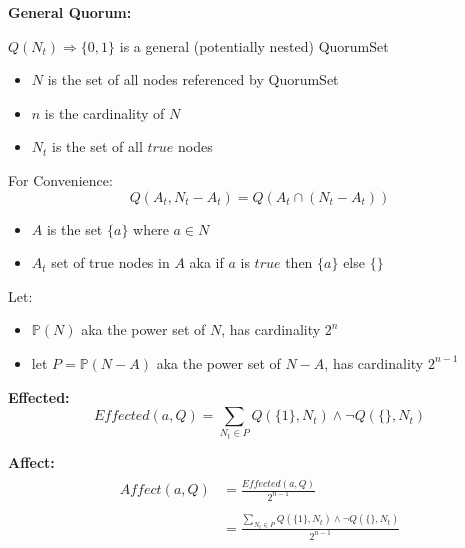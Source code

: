 \newcommand{\powerset}[1]{\mathbb{P}(#1)}

\newcommand{\effectedExpression}[0]{ \sum_{N_t \in P} Q(\{1\},N_t) \land \lnot Q(\{\},N_t) }
\newcommand{\affectDenomExpression}[0]{ 2^{n-1} }
\newcommand{\requireDenomExpression}[0]{ \sum_{N_t \in P} Q(\{a\},N_t) }
\newcommand{\influenceDenomExpression}[0]{ \sum_{N_t \in P} \lnot Q(\{\},N_t) }


\textbf{General Quorum:}\\\par
$Q(N_t) \Rightarrow \{0,1\}$ is a general (potentially nested) QuorumSet

\begin{itemize}
  \item $N$ is the set of all nodes referenced by QuorumSet
  \item $n$ is the cardinality of $N$
  \item $N_t$ is the set of all $true$ nodes
\end{itemize}

For Convenience:
\begin{equation}
    Q(A_t,N_t-A_t) = Q(A_t \cap (N_t-A_t))
\end{equation}
\begin{itemize}
  \item $A$ is the set $\{a\}$ where $a \in N$
  \item $A_t$ set of true nodes in $A$ aka if $a$ is $true$ then $\{a\}$ else $\{\}$
\end{itemize}

Let:
\begin{itemize}
  \item $\powerset{N}$ aka the power set of $N$, has cardinality $2^n$
  \item let $P = \powerset{N-A}$ aka the power set of $N-A$, has cardinality $2^{n-1}$
\end{itemize}





\leavevmode
\par
\textbf{Effected:}
\begin{equation}
    Effected(a,Q) = \effectedExpression{}
\end{equation}

\textbf{Affect:}
\begin{align}
\begin{split}
    Affect(a,Q) &= \frac{Effected(a,Q)}{\affectDenomExpression{}} \\
\\
                &= \frac{\effectedExpression{}}{\affectDenomExpression{}}
\end{split}
\end{align}

